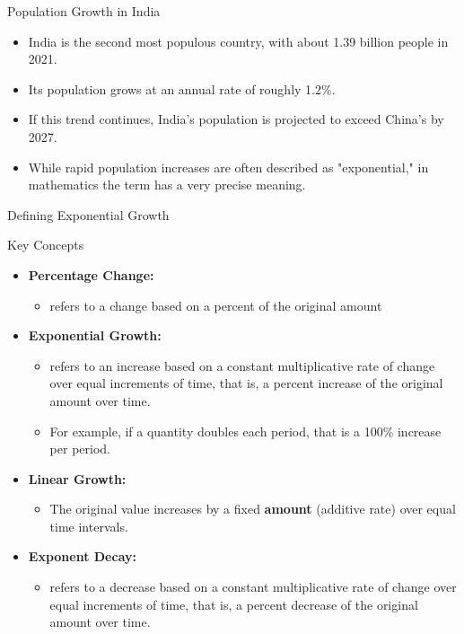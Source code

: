 \documentclass{beamer}
\begin{document}
\begin{frame}{Population Growth in India}
  \begin{itemize}
    \item India is the second most populous country, with about 1.39 billion people in 2021.
    \item Its population grows at an annual rate of roughly 1.2\%.
    \item If this trend continues, India's population is projected to exceed China’s by 2027.
    \item While rapid population increases are often described as "exponential," in mathematics the term has a very precise meaning.
  \end{itemize}
\end{frame}

\begin{frame}{Defining Exponential Growth}
  \begin{block}{Key Concepts}
    \begin{itemize}
      \item \textbf{Percentage Change:} 
      \begin{itemize}
        \item refers to a change based on a percent of the original amount
      \end{itemize}
      \item \textbf{Exponential Growth:} 
        \begin{itemize}
          \item refers to an increase based on a constant multiplicative rate of change over equal increments of time, that is, a percent increase of the original amount over time.
          \item For example, if a quantity doubles each period, that is a 100\% increase per period.
        \end{itemize}
      \item \textbf{Linear Growth:} 
        \begin{itemize}
          \item The original value increases by a fixed \textbf{amount} (additive rate) over equal time intervals.
        \end{itemize}
        \item \textbf{Exponent Decay:}
        \begin{itemize}
          \item refers to a decrease based on a constant multiplicative rate of change over equal increments of time, that is, a percent decrease of the original amount over time.
        \end{itemize}
    \end{itemize}
  \end{block}
\end{frame}
\end{document}
